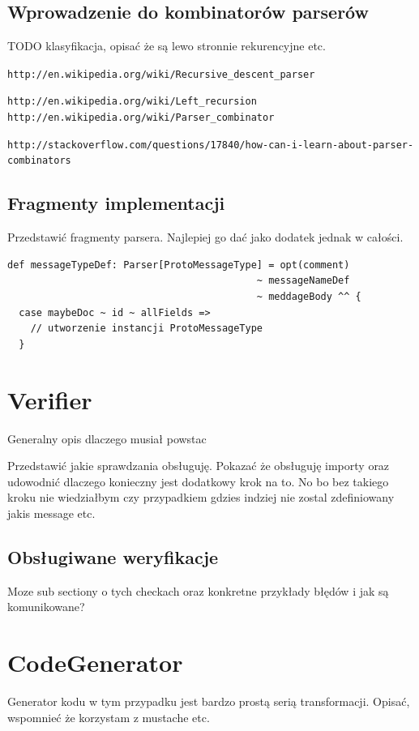 \documentclass[pdflatex,11pt]{aghdpl}
\begin{document}
\subsection{Wprowadzenie do kombinatorów parserów}
TODO klasyfikacja, opisać że są lewo stronnie rekurencyjne etc.

\verb|http://en.wikipedia.org/wiki/Recursive_descent_parser|

\verb|http://en.wikipedia.org/wiki/Left_recursion|
\verb|http://en.wikipedia.org/wiki/Parser_combinator|

\verb|http://stackoverflow.com/questions/17840/how-can-i-learn-about-parser-combinators|

\subsection{Fragmenty implementacji}
Przedstawić fragmenty parsera. Najlepiej go dać jako dodatek jednak w całości.

\begin{lstlisting}
def messageTypeDef: Parser[ProtoMessageType] = opt(comment) 
                                           ~ messageNameDef
                                           ~ meddageBody ^^ {
  case maybeDoc ~ id ~ allFields =>
    // utworzenie instancji ProtoMessageType
  }
\end{lstlisting}


\section{Verifier}
Generalny opis dlaczego musiał powstac

Przedstawić jakie sprawdzania obsługuję. 
Pokazać że obsługuję importy oraz udowodnić dlaczego konieczny jest dodatkowy krok na to.
No bo bez takiego kroku nie wiedziałbym czy przypadkiem gdzies indziej nie zostal zdefiniowany jakis message etc.

\subsection{Obsługiwane weryfikacje}
Moze sub sectiony o tych checkach oraz konkretne przykłady błędów i jak są komunikowane?


\section{CodeGenerator}
Generator kodu w tym przypadku jest bardzo prostą serią transformacji.
Opisać, wspomnieć że korzystam z mustache etc.
\end{document}
